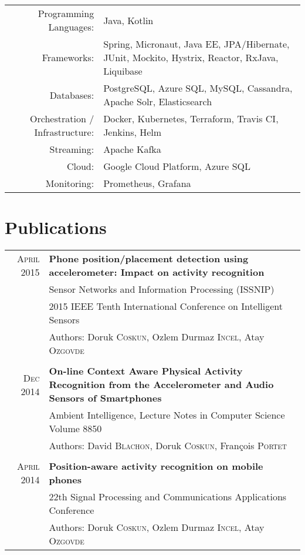 \documentclass[a4paper,10pt]{article} %
\begin{document}
\begin{tabular}{r|p{13cm}}
Programming Languages: & Java, Kotlin \\
Frameworks:  & Spring, Micronaut, Java EE, JPA/Hibernate, JUnit, Mockito, Hystrix, Reactor, RxJava, Liquibase \\
Databases: & PostgreSQL, Azure SQL, MySQL, Cassandra, Apache Solr, Elasticsearch \\
Orchestration / Infrastructure: & Docker, Kubernetes, Terraform, Travis CI, Jenkins, Helm \\
Streaming: & Apache Kafka \\
Cloud: & Google Cloud Platform, Azure SQL \\
Monitoring: & Prometheus, Grafana \\

\end{tabular}


\section{Publications}

\begin{tabular}{r|p{14cm}}
\textsc{April} 2015 &\normalsize\textbf {Phone position/placement detection using accelerometer: Impact on activity recognition} \\
& Sensor Networks and Information Processing (ISSNIP) \\
& 2015 IEEE Tenth International Conference on Intelligent Sensors \\
& Authors: Doruk \textsc{Coskun}, Ozlem Durmaz \textsc{Incel}, Atay \textsc{Ozgovde} \normalsize\\ \\

\textsc{Dec} 2014 &\normalsize\textbf {On-line Context Aware Physical Activity Recognition from the Accelerometer and Audio Sensors of Smartphones} \\
& Ambient Intelligence, Lecture Notes in Computer Science Volume 8850 \\
& Authors: David \textsc{Blachon}, Doruk \textsc{Coskun}, François \textsc{Portet} \normalsize\\ \\

\textsc{April} 2014 &\normalsize\textbf {Position-aware activity recognition on mobile phones} \\
& 22th Signal Processing and Communications Applications Conference \\
& Authors: Doruk \textsc{Coskun}, Ozlem Durmaz \textsc{Incel}, Atay \textsc{Ozgovde}


\end{tabular}
\end{document}
